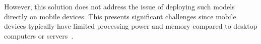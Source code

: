 \documentclass[licencjacka,en]{docs/pracamgr}
\begin{document}
However, this solution does not address the issue of deploying such models directly on mobile devices. This presents significant challenges since mobile devices typically have limited processing power and memory compared to desktop computers or servers~\cite{mobile_resources}.




 
\end{document}
